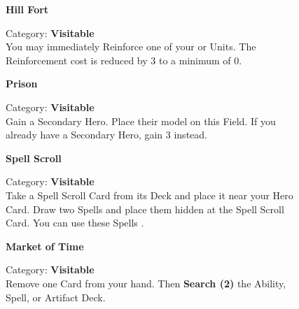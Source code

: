 \begin{figure}[H]
  \begin{minipage}[t]{0.47\textwidth}
    \vspace{0pt}
    \centering
    \phantom{j}\textbf{Hill Fort}\par
    \caption{\small Category: \textbf{Visitable}\\
      You may immediately Reinforce one of your  or  Units.
      The Reinforcement cost is reduced by 3  to a minimum of 0.}
  \end{minipage}\hfill
  \begin{minipage}[t]{0.47\textwidth}
    \vspace{0pt}
    \centering
    \phantom{j}\textbf{Prison}\par
    \caption{\small Category: \textbf{Visitable}\\
      Gain a Secondary Hero.
      Place their model on this Field.
      If you already have a Secondary Hero, gain 3  instead.}
  \end{minipage}
\end{figure}

\begin{figure}[H]
  \begin{minipage}[t]{0.47\textwidth}
    \vspace{0pt}
    \centering
    \textbf{Spell Scroll}\par
    \caption{\small Category: \textbf{Visitable}\\
      Take a Spell Scroll Card from its Deck and place it near your Hero Card. Draw two Spells and place them hidden at the Spell Scroll Card. You can use these Spells \protect{}.
    }
  \end{minipage}\hfill
  \begin{minipage}[t]{0.47\textwidth}
    \vspace{0pt}
    \centering
    \phantom{j}\textbf{Market of Time}\phantom{j}\par
    \caption{\small Category: \textbf{Visitable}\\ Remove one Card from your hand.
      Then \textbf{Search (2)} the Ability, Spell, or Artifact Deck.
    }
  \end{minipage}
\end{figure}


